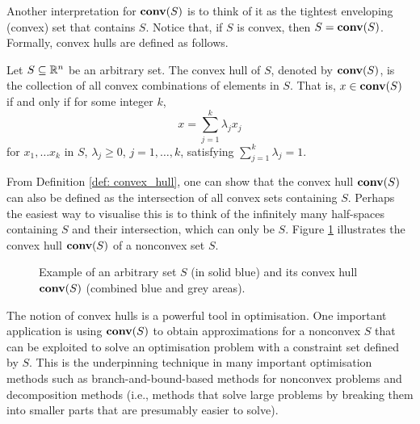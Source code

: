 Another interpretation for $\mathop{\bf conv}(S)$ is to think of it as the tightest enveloping (convex) set that contains $S$. Notice that, if $S$ is convex, then $S = \mathop{\bf conv}(S)$.  Formally, convex hulls are defined as follows.

\begin{definition}\label{def: convex_hull}
	Let $S \subseteq \mathbb{R}^n$ be an arbitrary set. The convex hull of $S$, denoted by $\mathop{\bf conv}(S)$, is the collection of all convex combinations of elements in $S$. That is, $x \in \mathop{\bf conv}(S)$ if and only if for some integer $k$, 
	\begin{equation*}
		x = \sum_{j=1}^k \lambda_jx_j
	\end{equation*}                       
	for $x_1,\dots x_k$ in $S$, $\lambda_j \ge 0$, $j= 1,\dots,k$, satisfying $\sum_{j=1}^k \lambda_j = 1$. 
\end{definition}
%

From Definition \ref{def: convex_hull}, one can show that the convex hull $\mathop{\bf conv}(S)$ can also be defined as the intersection of all convex sets containing $S$. Perhaps the easiest way to visualise this is to think of the infinitely many half-spaces containing $S$ and their intersection, which can only be $S$. Figure \ref{fig:convex_hull} illustrates the convex hull $\mathop{\bf conv}(S)$ of a nonconvex set $S$.
%
\begin{figure}[H]
\caption{Example of an arbitrary set $S$ (in solid blue) and its convex hull $\mathop{\bf conv}(S)$ (combined blue and grey areas).} \label{fig:convex_hull}
\end{figure}
%
The notion of convex hulls is a powerful tool in optimisation. One important application is using $\mathop{\bf conv}(S)$ to obtain approximations for a nonconvex $S$ that can be exploited to solve an optimisation problem with a constraint set defined by $S$. This is the underpinning technique in many important optimisation methods such as branch-and-bound-based methods for nonconvex problems and decomposition methods (i.e., methods that solve large problems by breaking them into smaller parts that are presumably easier to solve).  


